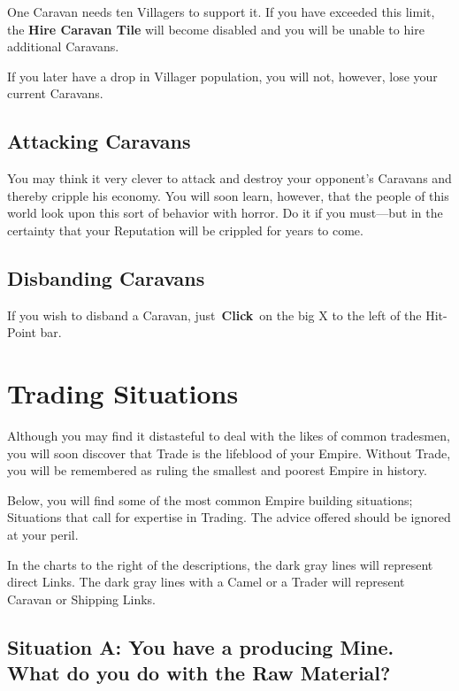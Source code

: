 
One Caravan needs ten Villagers to support it. If you have exceeded this limit, the \textbf{Hire Caravan Tile} will become disabled and you will be unable to hire additional Caravans.

If you later have a drop in Villager population, you will not, however, lose your current Caravans.

\subsection{Attacking Caravans}


 You may think it very clever to attack and destroy your opponent’s Caravans and thereby cripple his economy. You will soon learn, however, that the people of this world look upon this sort of behavior with horror. Do it if you must---but in the certainty that your Reputation will be crippled for years to come.

\subsection{Disbanding Caravans}


If you wish to disband a Caravan, just \textbf{Click} on the big X to the left of the Hit-Point bar.

\section{Trading Situations}

Although you may find it distasteful to deal with the likes of common tradesmen, you will soon discover that Trade is the lifeblood of your Empire. Without Trade, you will be remembered as ruling the smallest and poorest Empire in history.

Below, you will find some of the most common Empire building situations; Situations that call for expertise in Trading. The advice offered should be ignored at your peril.

In the charts to the right of the descriptions, the dark gray lines will represent direct Links. The dark gray lines with a Camel or a Trader will represent Caravan or Shipping Links.

\subsection{Situation A: You have a producing Mine. What do you do with the Raw Material?}

